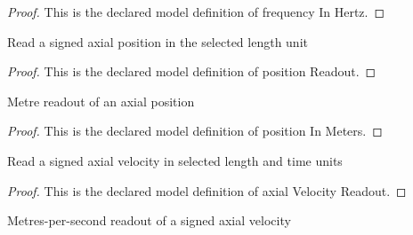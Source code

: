 \begin{proof}
  This is the declared model definition of frequency In Hertz.
\end{proof}
\begin{definition}
  \label{def:physics:phyx-mini-0194:phyxminiproblems-problemphyxmini0194-positionreadout}
  Read a signed axial position in the selected length unit
\end{definition}
\begin{proof}
  This is the declared model definition of position Readout.
\end{proof}
\begin{definition}
  \label{def:physics:phyx-mini-0194:phyxminiproblems-problemphyxmini0194-positioninmeters}
  Metre readout of an axial position
\end{definition}
\begin{proof}
  This is the declared model definition of position In Meters.
\end{proof}
\begin{definition}
  \label{def:physics:phyx-mini-0194:phyxminiproblems-problemphyxmini0194-axialvelocityreadout}
  Read a signed axial velocity in selected length and time units
\end{definition}
\begin{proof}
  This is the declared model definition of axial Velocity Readout.
\end{proof}
\begin{definition}
  \label{def:physics:phyx-mini-0194:phyxminiproblems-problemphyxmini0194-axialvelocityinmeterspersecond}
  Metres-per-second readout of a signed axial velocity
\end{definition}
